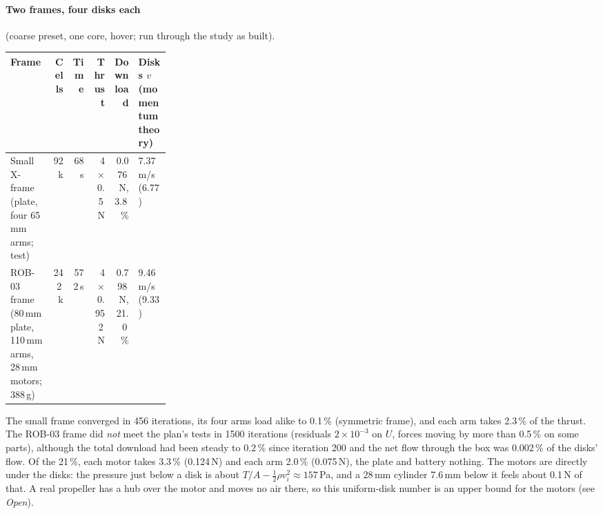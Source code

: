 \paragraph{Two frames, four disks each} (coarse preset, one core, hover; run through the study as built).
\begin{center}\small
\begin{tabular}{@{}p{0.27\linewidth}rrrrl@{}}
\toprule Frame & Cells & Time & Thrust & Download & Disks $v$ (momentum theory)\\ \midrule
Small X-frame (plate, four 65\,mm arms; test) & 92\,k & 68\,s & 4$\times$0.5\,N & 0.076\,N, 3.8\,\% & 7.37\,m/s (6.77)\\
ROB-03 frame (80\,mm plate, 110\,mm arms, 28\,mm motors; 388\,g) & 242\,k & 572\,s & 4$\times$0.952\,N & 0.798\,N, 21.0\,\% & 9.46\,m/s (9.33)\\
\bottomrule
\end{tabular}
\end{center}
The small frame converged in 456 iterations, its four arms load alike to 0.1\,\% (symmetric frame), and each arm
takes 2.3\,\% of the thrust. The ROB-03 frame did \emph{not} meet the plan's tests in 1500 iterations (residuals
$2\times10^{-3}$ on $U$, forces moving by more than 0.5\,\% on some parts), although the total download had been
steady to 0.2\,\% since iteration 200 and the net flow through the box was 0.002\,\% of the disks' flow. Of the 21\,\%,
each motor takes 3.3\,\% (0.124\,N) and each arm 2.0\,\% (0.075\,N), the plate and battery nothing. The motors are
directly under the disks: the pressure just below a disk is about $T/A-\tfrac12\rho v_i^2\approx157$\,Pa, and a
28\,mm cylinder 7.6\,mm below it feels about 0.1\,N of that. A real propeller has a hub over the motor and moves no air
there, so this uniform-disk number is an upper bound for the motors (see \emph{Open}).

